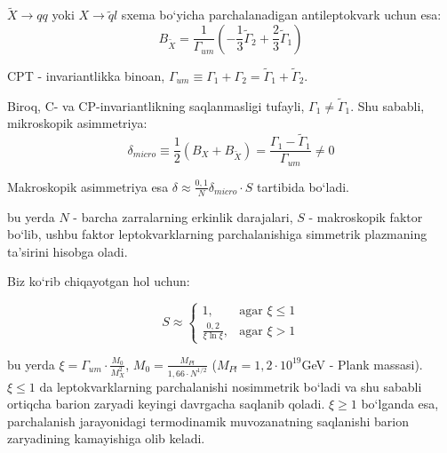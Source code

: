 \documentclass[14pt]{scrartcl}
\begin{document}
$\tilde{X}\rightarrow qq$ yoki $X\rightarrow\tilde{q}l$ sxema bo`yicha parchalanadigan antileptokvark uchun esa:
\begin{equation}
B_{\tilde {X}} = \frac{1}{\Gamma_{um}}\left(-\frac{1}{3}\tilde{\Gamma}_{2} +\frac{2}{3}\tilde{\Gamma}_{1}\right)
\label{3}
\end{equation}

CPT - invariantlikka binoan, $\Gamma_{um} \equiv \Gamma_{1} +\Gamma_{2}=\tilde{\Gamma}_{1}+\tilde{\Gamma}_{2}$.

Biroq, C- va CP-invariantlikning saqlanmasligi tufayli, $\Gamma_{1}\neq \tilde{\Gamma}_{1}$. Shu sababli, mikroskopik asimmetriya:
\begin{equation}
\delta_{micro}\equiv\frac{1}{2}\left(B_{X}+B_{\tilde{X}}\right) = 
\frac{\Gamma_{1}-\tilde{\Gamma}_{1}}{\Gamma_{um}}\neq 0
\label{4}
\end{equation}

Makroskopik asimmetriya esa $\delta\approx\frac{0,1}{N}\delta_{micro}\cdot S$ tartibida bo`ladi.

bu yerda $N$ - barcha zarralarning erkinlik darajalari, $S$ - makroskopik faktor bo`lib, ushbu faktor leptokvarklarning parchalanishiga simmetrik plazmaning ta'sirini hisobga oladi.

Biz ko`rib chiqayotgan hol uchun:


\begin{equation}
	S \approx  \begin{cases} 1, & \mbox{agar } \xi \le 1\\ \frac{0,2}{\xi \ln{\xi}}, & \mbox{agar } \xi > 1 \end{cases}
	\end{equation}
	
	bu yerda $\xi=\Gamma_{um}\cdot\frac{M_{0}}{M^{2}_{X}}$, $M_{0}=\frac{M_{Pl}}{1,66\cdot N^{1/2}}$ ($M_{Pl}=1,2\cdot 10^{19}$GeV - Plank massasi). $\xi \le 1$ da leptokvarklarning parchalanishi nosimmetrik bo`ladi va shu sababli ortiqcha barion zaryadi keyingi davrgacha saqlanib qoladi. $\xi \ge 1$ bo`lganda esa, parchalanish jarayonidagi termodinamik muvozanatning saqlanishi barion zaryadining kamayishiga olib keladi. 
\renewcommand{\refname}{Foydalanilgan adabiyotlar}
\newpage
{}
\end{document}
